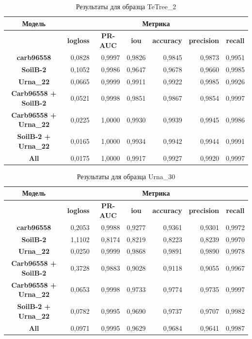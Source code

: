\documentclass[14pt, a4paper, oneside, bold]{extarticle}
\begin{document}
\begin{table}[htbp]
\small
\begin{tabular}{|c|r|r|r|r|r|r|}
\hline
\textbf{Модель} & \multicolumn{ 6}{c|}{\textbf{Метрика}} \\ \hline
\textbf{} & \multicolumn{1}{c|}{\textbf{logloss}} & \multicolumn{1}{c|}{\textbf{PR-AUC}} & \multicolumn{1}{c|}{\textbf{iou}} & \multicolumn{1}{c|}{\textbf{accuracy}} & \multicolumn{1}{c|}{\textbf{precision}} & \multicolumn{1}{c|}{\textbf{recall}} \\ \hline
\textbf{carb96558} & 0,0828 & 0,9997 & 0,9826 & 0,9845 & 0,9873 & 0,9951 \\ \hline
\textbf{SoilB-2} & 0,1052 & 0,9986 & 0,9647 & 0,9678 & 0,9660 & 0,9985 \\ \hline
\textbf{Urna\_22} & 0,0665 & 0,9999 & 0,9911 & 0,9922 & 0,9985 & 0,9926 \\ \hline
\textbf{Carb96558 + SoilB-2} & 0,0521 & 0,9998 & 0,9851 & 0,9867 & 0,9854 & 0,9997 \\ \hline
\textbf{Carb96558 + Urna\_22} & 0,0225 & 1,0000 & 0,9930 & 0,9939 & 0,9945 & 0,9986 \\ \hline
\textbf{SoilB-2 + Urna\_22} & 0,0165 & 1,0000 & 0,9934 & 0,9942 & 0,9944 & 0,9991 \\ \hline
\textbf{All} & 0,0175 & 1,0000 & 0,9917 & 0,9927 & 0,9920 & 0,9997 \\ \hline
\end{tabular}
\caption{Результаты для образца TeTree\_2}
\label{TeTree_2}
\end{table}


\begin{table}[htbp]
\small
\begin{tabular}{|c|r|r|r|r|r|r|}
\hline
\textbf{Модель} & \multicolumn{ 6}{c|}{\textbf{Метрика}} \\ \hline
\textbf{} & \multicolumn{1}{c|}{\textbf{logloss}} & \multicolumn{1}{c|}{\textbf{PR-AUC}} & \multicolumn{1}{c|}{\textbf{iou}} & \multicolumn{1}{c|}{\textbf{accuracy}} & \multicolumn{1}{c|}{\textbf{precision}} & \multicolumn{1}{c|}{\textbf{recall}} \\ \hline
\textbf{carb96558} & 0,2053 & 0,9988 & 0,9277 & 0,9361 & 0,9301 & 0,9972 \\ \hline
\textbf{SoilB-2} & 1,1102 & 0,8174 & 0,8219 & 0,8223 & 0,8239 & 0,9970 \\ \hline
\textbf{Urna\_22} & 0,0250 & 0,9999 & 0,9868 & 0,9891 & 0,9890 & 0,9978 \\ \hline
\textbf{Carb96558 + SoilB-2} & 0,3728 & 0,9883 & 0,9028 & 0,9118 & 0,9055 & 0,9967 \\ \hline
\textbf{Carb96558 + Urna\_22} & 0,0653 & 0,9998 & 0,9733 & 0,9774 & 0,9735 & 0,9997 \\ \hline
\textbf{SoilB-2 + Urna\_22} & 0,0782 & 0,9995 & 0,9690 & 0,9737 & 0,9707 & 0,9982 \\ \hline
\textbf{All} & 0,0971 & 0,9995 & 0,9629 & 0,9684 & 0,9641 & 0,9987 \\ \hline
\end{tabular}
\caption{Результаты для образца Urna\_30}
\label{Urna_30}
\end{table}
\end{document}
